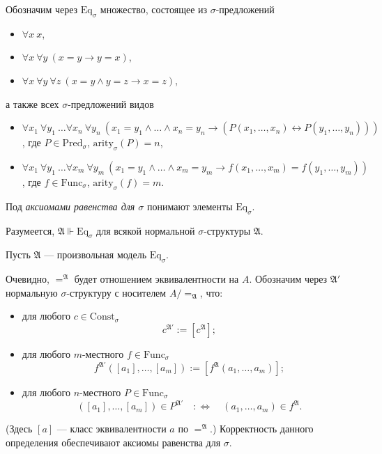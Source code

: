 \documentclass[12pt,a4paper]{article}
\newcommand{\Pred}{\ensuremath{\mathrm{Pred}}\xspace}
\newcommand{\Func}{\ensuremath{\mathrm{Func}}\xspace}
\newcommand{\Const}{\ensuremath{\mathrm{Const}}\xspace}
\newcommand{\arity}{\ensuremath{\mathrm{arity}}\xspace}
\newcommand{\Eq}{\ensuremath{\mathrm{Eq}}\xspace}
\begin{document}
    \begin{definition}
        Обозначим через $\Eq_\sigma$ множество, состоящее из $\sigma$-предложений
        \begin{itemize}
            \item $\forall x\ x$,
            \item $\forall x\ \forall y\ (x = y \rightarrow y = x)$,
            \item $\forall x\ \forall y\ \forall z\ (x = y \wedge y = z \rightarrow x = z)$,
        \end{itemize}
        а также всех $\sigma$-предложений видов
        \begin{itemize}
            \item $\forall x_1\ \forall y_1\ \dots \forall x_n\ \forall y_n\ (x_1 = y_1 \wedge \dots \wedge x_n = y_n \rightarrow (P(x_1, \dots, x_n) \leftrightarrow P(y_1, \dots, y_n)))$, где $P \in \Pred_\sigma$, $\arity_\sigma(P) = n$,
            \item $\forall x_1\ \forall y_1\ \dots \forall x_m\ \forall y_m\ (x_1 = y_1 \wedge \dots \wedge x_m = y_m \rightarrow f(x_1, \dots, x_m) = f(y_1, \dots, y_m))$, где $f \in \Func_\sigma$, $\arity_\sigma(f) = m$.
        \end{itemize}
        Под \emph{аксиомами равенства для $\sigma$} понимают элементы $\Eq_\sigma$.
    \end{definition}

    \begin{remark}
        Разумеется, $\mathfrak{A} \Vdash \Eq_\sigma$ для всякой нормальной $\sigma$-структуры $\mathfrak{A}$.
    \end{remark}

    \begin{definition}
        Пусть $\mathfrak{A}$ --- произвольная модель $\Eq_\sigma$.

        Очевидно, ${=}^\mathfrak{A}$ будет отношением эквивалентности на $A$. Обозначим через $\mathfrak{A}'$ нормальную $\sigma$-структуру с носителем $A/{=}_\mathfrak{A}$, что:
        \begin{itemize}
            \item для любого $c \in \Const_\sigma$
                \[c^{\mathfrak{A}'} := [c^\mathfrak{A}];\]
            \item для любого $m$-местного $f \in \Func_\sigma$
                \[f^{\mathfrak{A}'}([a_1], \dots, [a_m]) := [f^\mathfrak{A}(a_1, \dots, a_m)];\]
            \item для любого $n$-местного $P \in \Func_\sigma$
                \[([a_1], \dots, [a_m]) \in P^{\mathfrak{A}'} \quad :\Longleftrightarrow \quad (a_1, \dots, a_m) \in f^\mathfrak{A}.\]
        \end{itemize}
        (Здесь $[a]$ --- класс эквивалентности $a$ по ${=}^\mathfrak{A}$.) Корректность данного определения обеспечивают аксиомы равенства для $\sigma$.
    \end{definition}
\end{document}
